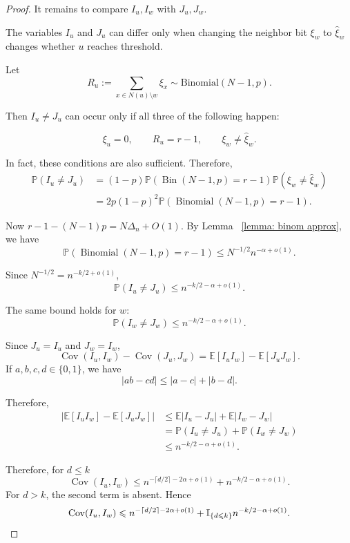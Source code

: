 \documentclass[10pt,a4paper]{amsart}
\renewcommand{\le}{\leqslant}
\begin{document}
\begin{proof}
It remains to compare $I_u,I_w$ with $J_u,J_w$.

The variables $I_u$ and $J_u$ can differ only when changing the neighbor bit $\xi_w$ to $\widehat\xi_w$ changes whether $u$ reaches threshold.

Let $$ R_u
:=
\sum_{x\in N(u)\setminus{w}}\xi_x
\sim\text{Binomial}(N-1,p).
$$

Then $I_u\ne J_u$ can occur only if all three of the following happen:

$$
\xi_u=0,\qquad
R_u=r-1,\qquad
\xi_w\ne\widehat\xi_w.
$$

In fact, these conditions are also sufficient. Therefore,
\begin{align*}
\mathbb P(I_u\ne J_u)
&=
(1-p)
\mathbb P\left(
\operatorname{Bin}(N-1,p)=r-1
\right)
\mathbb P(\xi_w\ne\widehat\xi_w)\\
&=
2p(1-p)^2
\mathbb P\left(
\operatorname{Binomial}(N-1,p)=r-1
\right).
\end{align*}

Now $r-1-(N-1)p= N\Delta_n+O(1).$ By Lemma ~\ref{lemma: binom approx}, we have
$$
\mathbb P\left(
\operatorname{Binomial}(N-1,p)=r-1
\right)
\le
N^{-1/2}n^{-\alpha+o(1)}.
$$

Since $N^{-1/2}=n^{-k/2+o(1)}$,$$
\mathbb P(I_u\ne J_u)
\le
n^{-k/2-\alpha+o(1)}.
$$


The same bound holds for $w$:
$$
\mathbb P(I_w\ne J_w)
\le
n^{-k/2-\alpha+o(1)}.
$$

Since $J_u=I_u$ and $J_w=I_w$, 
$$
\operatorname{Cov}(I_u,I_w)
-\operatorname{Cov}(J_u,J_w)
=
\mathbb E[I_uI_w]-\mathbb E[J_uJ_w].
$$
If $a,b,c,d \in \{0,1\}$, we have 
$$|ab-cd|
\le |a-c|+|b-d|.$$


Therefore,
\begin{align*}
\left|
\mathbb E[I_uI_w]-\mathbb E[J_uJ_w]
\right|
&\le
\mathbb E|I_u-J_u|
+
\mathbb E|I_w-J_w|\\
&=
\mathbb P(I_u\ne J_u)
+
\mathbb P(I_w\ne J_w)\\
&\le
n^{-k/2-\alpha+o(1)}.
\end{align*}


Therefore, for $d \le k$
$$
\operatorname{Cov}(I_u,I_w)
\le
n^{-\lceil d/2\rceil-2\alpha+o(1)}
+
n^{-k/2-\alpha+o(1)}. 
$$
For $d>k$, the second term is absent. Hence
$$
\operatorname{Cov}(I_u,I_w)
\le
n^{-\lceil d/2\rceil-2\alpha+o(1)}
+
\mathbb{I}_{\{d\le k\}}
n^{-k/2-\alpha+o(1)}. \qedhere
$$

\end{proof}
\end{document}
